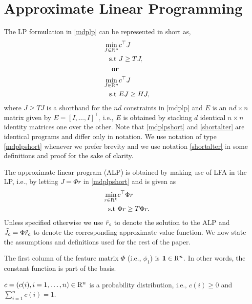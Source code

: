 \section{Approximate Linear Programming}
The LP formulation in \eqref{mdplp} can be represented in short as,
\begin{align}\label{mdplpshort}
\min_{J\in \mathrm{R}^n} &c^\top J\nonumber\\
\text{s.t}\mbox{ } &J\geq T J,\\
\textbf{or}\nonumber\\
\label{shortalter}
\min_{J\in \mathrm{R}^n} &c^\top J\nonumber\\
\text{s.t}\mbox{ } &EJ\geq H J,\\
\end{align}
where $J\geq TJ$ is a shorthand for the $nd$ constraints in \eqref{mdplp} and $E$ is an $nd\times n$ matrix given by $E=[I,\ldots,I]^\top$, i.e., $E$ is obtained by stacking $d$ identical $n\times n$ identity matrices one over the other. Note that \eqref{mdplpshort} and \eqref{shortalter} are identical programs and differ only in notation. We use notation of type \eqref{mdplpshort} whenever we prefer brevity and we use notation \eqref{shortalter} in some definitions and proof for the sake of clarity.
\begin{comment}
We also follow the convention that constraints $(i-1)\times n+1,\ldots,i\times n$ correspond to the $i^{th}$ action, i.e., the first $n$ constraints correspond to action $1$, and the constraints from $n+1$ to $2n$ correspond to action $2$ and so on. \\
\end{comment}
The approximate linear program (ALP) is obtained by making use of LFA in the LP, i.e., by letting $J=\Phi r$ in \eqref{mdplpshort} and is given as
\begin{align}\label{alp}
\min_{r\in \mathrm{R}^k} &c^\top \Phi r\nonumber\\
\text{s.t}\mbox{ } &\Phi r\geq T \Phi r.
\end{align}
Unless specified otherwise we use $\tilde{r}_c$ to denote the solution to the ALP and $\tilde{J}_c=\Phi \tilde{r}_c$ to denote the corresponding approximate value function. We now state the assumptions and definitions used for the rest of the paper.
\begin{assumption}\label{one}
The first column of the feature matrix $\Phi$ (i.e., $\phi_1$) is $\mathbf{1} \in \mathrm{R}^n$. In other words, the constant function is part of the basis.
\end{assumption}
\begin{assumption}\label{probdist}
$c=(c(i),i=1,\ldots,n)\in \mathrm{R}^n$ is a probability distribution, i.e., $c(i)\geq 0$ and $\sum_{i=1}^n c(i)=1$.
\end{assumption}
